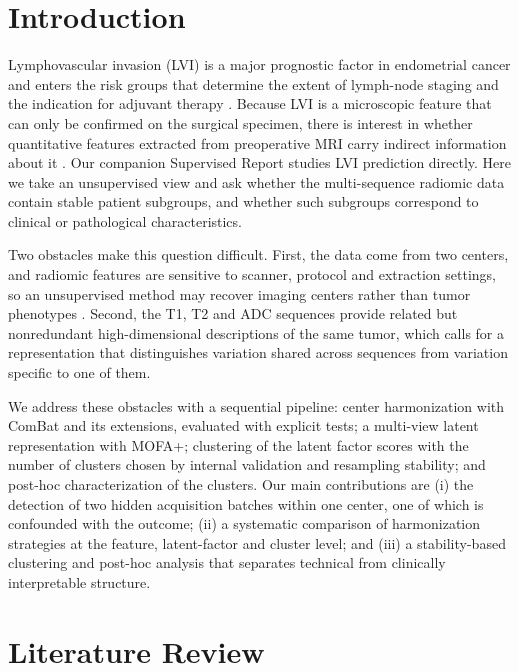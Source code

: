 \documentclass[conference]{IEEEtran}
\begin{document}
\section{Introduction}

Lymphovascular invasion (LVI) is a major prognostic factor in endometrial cancer and enters the risk groups that determine the extent of lymph-node staging and the indication for adjuvant therapy \cite{concin2021esgo}. Because LVI is a microscopic feature that can only be confirmed on the surgical specimen, there is interest in whether quantitative features extracted from preoperative MRI carry indirect information about it \cite{luo2020multiparametric,long2021mri,liu2024multimodal,ma2025predictive}. Our companion Supervised Report studies LVI prediction directly. Here we take an unsupervised view and ask whether the multi-sequence radiomic data contain stable patient subgroups, and whether such subgroups correspond to clinical or pathological characteristics.

Two obstacles make this question difficult. First, the data come from two centers, and radiomic features are sensitive to scanner, protocol and extraction settings, so an unsupervised method may recover imaging centers rather than tumor phenotypes \cite{mali2021radiomics,fortin2018cortical}. Second, the T1, T2 and ADC sequences provide related but nonredundant high-dimensional descriptions of the same tumor, which calls for a representation that distinguishes variation shared across sequences from variation specific to one of them.

We address these obstacles with a sequential pipeline: center harmonization with ComBat and its extensions, evaluated with explicit tests; a multi-view latent representation with MOFA+; clustering of the latent factor scores with the number of clusters chosen by internal validation and resampling stability; and post-hoc characterization of the clusters. Our main contributions are (i) the detection of two hidden acquisition batches within one center, one of which is confounded with the outcome; (ii) a systematic comparison of harmonization strategies at the feature, latent-factor and cluster level; and (iii) a stability-based clustering and post-hoc analysis that separates technical from clinically interpretable structure.

\section{Literature Review}
\end{document}
